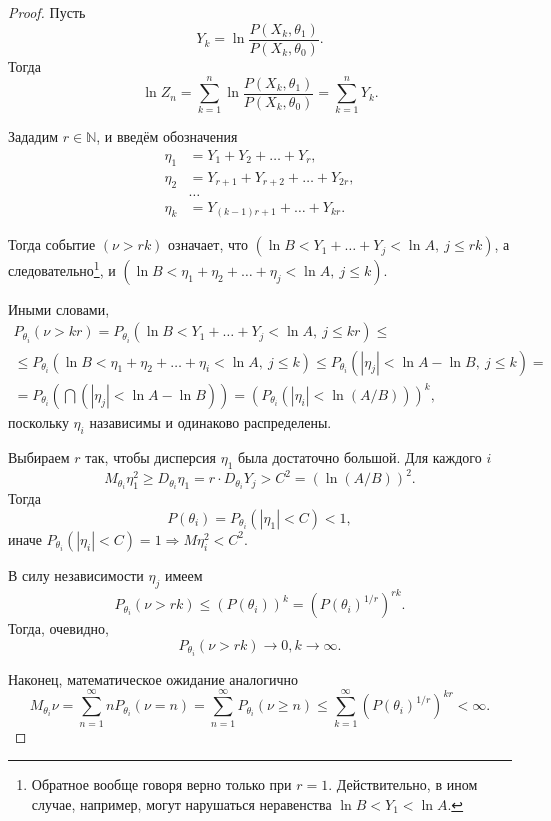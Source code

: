 \begin{proof}
  Пусть
  \[
    Y_k = \ln \dfrac{P(X_k, \theta_1)}{P(X_k, \theta_0)}.
  \]
  Тогда
  \[
    \ln Z_n = \sum_{k=1}^n \ln \dfrac{P(X_k, \theta_1)}{P(X_k, \theta_0)} =
    \sum_{k=1}^n Y_k.
  \]

  Зададим $r \in \mathbb{N}$, и введём обозначения
  \begin{align*}
    \eta_1 &= Y_1 + Y_2 + \ldots + Y_r, \\
    \eta_2 &= Y_{r+1} + Y_{r+2} + \ldots + Y_{2r}, \\
           &\dots \\
    \eta_k &= Y_{(k-1) r + 1} + \ldots + Y_{kr}.
  \end{align*}

  Тогда событие $(\nu > rk)$ означает, что $(\ln B < Y_1 + \dots + Y_j < \ln A,\
  j \leqslant rk)$, а следовательно\footnote{Обратное вообще говоря верно только при $ r=1 $.
    Действительно, в ином случае, например, могут нарушаться неравенства $ \ln B
  < Y_1 < \ln A$.}, и $(\ln B < \eta_1 + \eta_2 + \dots + \eta_j
  < \ln A,\ j \leqslant k)$.

Иными словами,
  \begin{multline*}
    P_{\theta_i} (\nu > kr)
    = P_{\theta_i} (\ln B < Y_1 + \dots + Y_j < \ln A,\ j \leqslant kr) \leqslant \\
    \leqslant P_{\theta_i} (\ln B < \eta_1 + \eta_2 + \dots + \eta_i < \ln A,\ j
    \leqslant k) \leqslant P_{\theta_i} (|\eta_j| < \ln A - \ln B,\ j \leqslant k) =\\
    = P_{\theta_i} \left(\bigcap (|\eta_j| < \ln A - \ln B)\right) =
     (P_{\theta_i} (|\eta_i| < \ln (A/B)))^k,
  \end{multline*}
  поскольку $\eta_i$ назависимы и одинаково распределены. 

  Выбираем $ r $ так, чтобы дисперсия $\eta_1$ была достаточно большой. Для
  каждого $ i $
  \[
    M_{\theta_i} \eta_1^2 \geqslant D_{\theta_i} \eta_1
    = r \cdot D_{\theta_i} Y_j > C^2 = (\ln (A/B))^2.
  \]
  Тогда
  \[
    P(\theta_i) = P_{\theta_i} (|\eta_1| < C) < 1,
  \]
  иначе $P_{\theta_i} (|\eta_i| < C) = 1 \Rightarrow M \eta_i^2 < C^2$.

  В силу независимости $\eta_j$ имеем
  \[
    P_{\theta_i} (\nu > rk) \leqslant (P(\theta_i))^k =
    (P(\theta_i)^{1/r})^{rk}.
  \]
  Тогда, очевидно,
  \[
    P_{\theta_i} (\nu > rk) \to 0, k \to \infty.
  \]
  
  Наконец, математическое ожидание аналогично
  \[
    M_{\theta_i} \nu
    = \sum_{n=1}^{\infty} n P_{\theta_i} (\nu  = n)
    = \sum_{n=1}^{\infty} P_{\theta_i} (\nu \geqslant n)
    \leqslant \sum_{k=1}^{\infty} ( P(\theta_i)^{1/r} )^{kr}
    < \infty.
\]
\end{proof}

